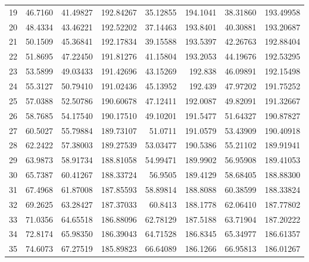 \begin{table}[ht!]
{\begin{tabular}{@{}rrrrrrrr@{}}
19 & 46.7160 & 41.49827 & 192.84267 & 35.12855 & 194.1041 & 38.31860 & 193.49958 \\
20 & 48.4334 & 43.46221 & 192.52202 & 37.14463 & 193.8401 & 40.30881 & 193.20687 \\
21 & 50.1509 & 45.36841 & 192.17834 & 39.15588 & 193.5397 & 42.26763 & 192.88404 \\
22 & 51.8695 & 47.22450 & 191.81276 & 41.15804 & 193.2053 & 44.19676 & 192.53295 \\
23 & 53.5899 & 49.03433 & 191.42696 & 43.15269 & 192.838  & 46.09891 & 192.15498 \\
24 & 55.3127 & 50.79410 & 191.02436 & 45.13952 & 192.439  & 47.97202 & 191.75252 \\
25 & 57.0388 & 52.50786 & 190.60678 & 47.12411 & 192.0087 & 49.82091 & 191.32667 \\
26 & 58.7685 & 54.17540 & 190.17510 & 49.10201 & 191.5477 & 51.64327 & 190.87827 \\
27 & 60.5027 & 55.79884 & 189.73107 & 51.0711  & 191.0579 & 53.43909 & 190.40918 \\
28 & 62.2422 & 57.38003 & 189.27539 & 53.03477 & 190.5386 & 55.21102 & 189.91941 \\
29 & 63.9873 & 58.91734 & 188.81058 & 54.99471 & 189.9902 & 56.95908 & 189.41053 \\
30 & 65.7387 & 60.41267 & 188.33724 & 56.9505  & 189.4129 & 58.68405 & 188.88300 \\
31 & 67.4968 & 61.87008 & 187.85593 & 58.89814 & 188.8088 & 60.38599 & 188.33824 \\
32 & 69.2625 & 63.28427 & 187.37033 & 60.8413  & 188.1778 & 62.06410 & 187.77802 \\
33 & 71.0356 & 64.65518 & 186.88096 & 62.78129 & 187.5188 & 63.71904 & 187.20222 \\
34 & 72.8174 & 65.98350 & 186.39043 & 64.71528 & 186.8345 & 65.34977 & 186.61357 \\
35 & 74.6073 & 67.27519 & 185.89823 & 66.64089 & 186.1266 & 66.95813 & 186.01267 \\ \bottomrule
\end{tabular}%
}
\end{table}
\vfill
\clearpage

